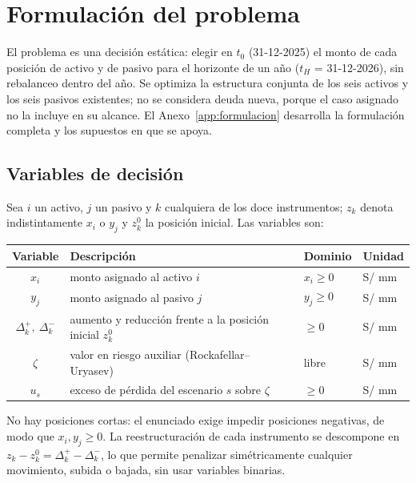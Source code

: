 \section{Formulación del problema}\label{sec:formulacion}

El problema es una decisión estática: elegir en $t_0$ (31-12-2025) el monto de cada posición de activo y de
pasivo para el horizonte de un año ($t_H$ = 31-12-2026), sin rebalanceo dentro del año. Se optimiza la
estructura conjunta de los seis activos y los seis pasivos existentes; no se considera deuda nueva, porque el
caso asignado no la incluye en su alcance. El Anexo~\ref{app:formulacion} desarrolla la formulación completa y los supuestos en que se apoya.

\subsection{Variables de decisión}
Sea $i$ un activo, $j$ un pasivo y $k$ cualquiera de los doce instrumentos; $z_k$ denota indistintamente
$x_i$ o $y_j$ y $z_k^0$ la posición inicial. Las variables son:

\begin{center}
\begin{tabular}{clll}
\toprule
Variable & Descripción & Dominio & Unidad \\
\midrule
$x_i$ & monto asignado al activo $i$ & $x_i \ge 0$ & S/ mm \\
$y_j$ & monto asignado al pasivo $j$ & $y_j \ge 0$ & S/ mm \\
$\Delta_k^+,\ \Delta_k^-$ & aumento y reducción frente a la posición inicial $z_k^0$ & $\ge 0$ & S/ mm \\
$\zeta$ & valor en riesgo auxiliar (Rockafellar--Uryasev) & libre & S/ mm \\
$u_s$ & exceso de pérdida del escenario $s$ sobre $\zeta$ & $\ge 0$ & S/ mm \\
\bottomrule
\end{tabular}
\end{center}

No hay posiciones cortas: el enunciado exige impedir posiciones negativas, de modo que $x_i, y_j \ge 0$.
La reestructuración de cada instrumento se descompone en $z_k - z_k^0 = \Delta_k^+ - \Delta_k^-$, lo que
permite penalizar simétricamente cualquier movimiento, subida o bajada, sin usar variables binarias.

